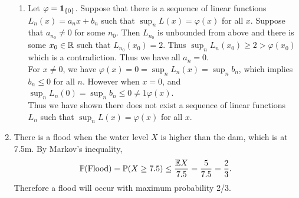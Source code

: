 \documentclass{article}
\begin{document}
\begin{enumerate}
\begin{enumerate}
		\item Let $\varphi={\mathbf 1}_{\{0\}}$. Suppose that there is a sequence of linear functions $L_n(x)=a_nx+b_n$ such that $\sup_n L(x)=\varphi(x)$ for all $x$. Suppose that $a_{n_0}\neq 0$ for some $n_0$. Then $L_{n_0}$ is unbounded from above and there is some $x_0\in {\mathbb R}$ such that $L_{n_0}(x_0)=2$. Thus $\sup_n L_n(x_0)\geq 2>\varphi(x_0)$ which is a contradiction. Thus we have all $a_n=0$.\\
		\newline
		For $x\neq 0$, we have $\varphi(x)=0=\sup_n L_n(x)=\sup_n b_n$, which implies $b_n\leq 0$ for all $n$. However when $x=0$, and $\sup_n L_n(0)=\sup_n b_n\leq 0\neq 1 \varphi(x)$. \\
		\newline
		Thus we have shown there does not exist a sequence of linear  functions $L_n$ such that $\sup_n L(x)=\varphi(x)$ for all $x$.
		\end{enumerate}
	\item There is a flood when the water level $X$ is higher than the dam, which is at 7.5m. By Markov's inequality,
	\begin{align*}
	{\mathbb P}(\text{Flood})={\mathbb P}(X\geq 7.5)\leq \frac{{\mathbb E} X}{7.5}=\frac{5}{7.5}=\frac{2}{3}.
	\end{align*}
	Therefore a flood will occur with maximum probability 2/3.
	

\end{enumerate}
\end{document}
